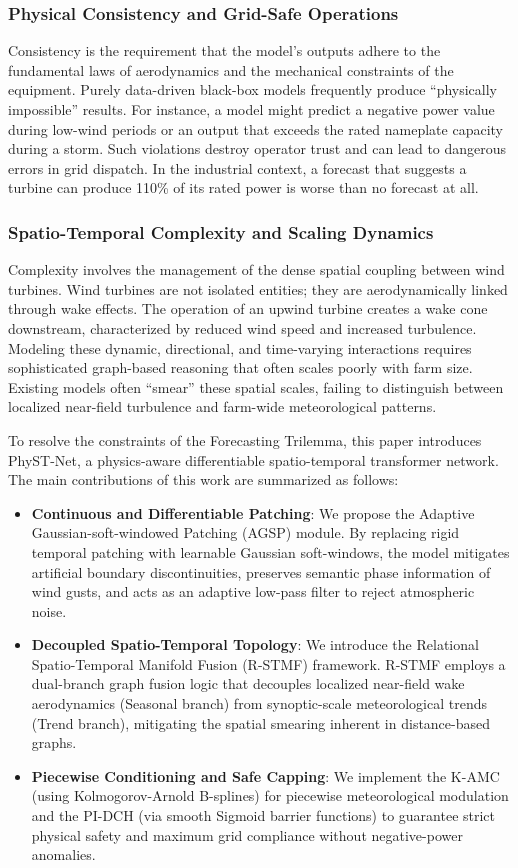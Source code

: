 \subsubsection{Physical Consistency and Grid-Safe Operations}
\label{sec:consistency}
Consistency is the requirement that the model's outputs adhere to the fundamental laws of aerodynamics and the mechanical constraints of the equipment. Purely data-driven black-box models frequently produce ``physically impossible'' results. For instance, a model might predict a negative power value during low-wind periods or an output that exceeds the rated nameplate capacity during a storm. Such violations destroy operator trust and can lead to dangerous errors in grid dispatch. In the industrial context, a forecast that suggests a turbine can produce 110\% of its rated power is worse than no forecast at all.

\subsubsection{Spatio-Temporal Complexity and Scaling Dynamics}
\label{sec:complexity}
Complexity involves the management of the dense spatial coupling between wind turbines. Wind turbines are not isolated entities; they are aerodynamically linked through wake effects. The operation of an upwind turbine creates a wake cone downstream, characterized by reduced wind speed and increased turbulence. Modeling these dynamic, directional, and time-varying interactions requires sophisticated graph-based reasoning that often scales poorly with farm size. Existing models often ``smear'' these spatial scales, failing to distinguish between localized near-field turbulence and farm-wide meteorological patterns.

To resolve the constraints of the Forecasting Trilemma, this paper introduces PhyST-Net, a physics-aware differentiable spatio-temporal transformer network. The main contributions of this work are summarized as follows:
\begin{itemize}
    \item \textbf{Continuous and Differentiable Patching}: We propose the Adaptive Gaussian-soft-windowed Patching (AGSP) module. By replacing rigid temporal patching with learnable Gaussian soft-windows, the model mitigates artificial boundary discontinuities, preserves semantic phase information of wind gusts, and acts as an adaptive low-pass filter to reject atmospheric noise.
    \item \textbf{Decoupled Spatio-Temporal Topology}: We introduce the Relational Spatio-Temporal Manifold Fusion (R-STMF) framework. R-STMF employs a dual-branch graph fusion logic that decouples localized near-field wake aerodynamics (Seasonal branch) from synoptic-scale meteorological trends (Trend branch), mitigating the spatial smearing inherent in distance-based graphs.
    \item \textbf{Piecewise Conditioning and Safe Capping}: We implement the K-AMC (using Kolmogorov-Arnold B-splines) for piecewise meteorological modulation and the PI-DCH (via smooth Sigmoid barrier functions) to guarantee strict physical safety and maximum grid compliance without negative-power anomalies.
\end{itemize}

